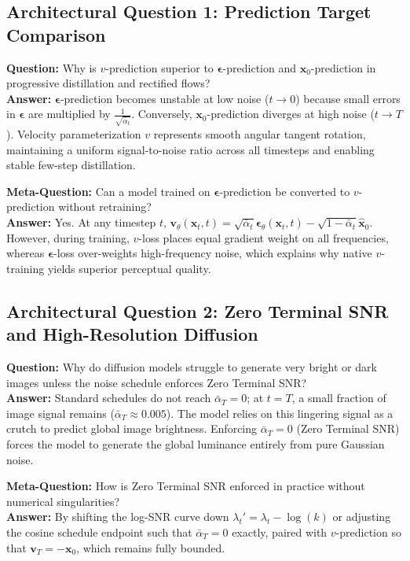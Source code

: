 \documentclass[11pt,a4paper]{article}
\theoremstyle{definition}
\begin{document}
\subsection{Architectural Question 1: Prediction Target Comparison}
\textbf{Question:} Why is $v$-prediction superior to $\boldsymbol{\epsilon}$-prediction and $\mathbf{x}_0$-prediction in progressive distillation and rectified flows?\\
\textbf{Answer:} $\boldsymbol{\epsilon}$-prediction becomes unstable at low noise ($t \to 0$) because small errors in $\boldsymbol{\epsilon}$ are multiplied by $\frac{1}{\sqrt{\bar{\alpha}_t}}$. Conversely, $\mathbf{x}_0$-prediction diverges at high noise ($t \to T$). Velocity parameterization $v$ represents smooth angular tangent rotation, maintaining a uniform signal-to-noise ratio across all timesteps and enabling stable few-step distillation.

\textbf{Meta-Question:} Can a model trained on $\boldsymbol{\epsilon}$-prediction be converted to $v$-prediction without retraining?\\
\textbf{Answer:} Yes. At any timestep $t$, $\mathbf{v}_\theta(\mathbf{x}_t, t) = \sqrt{\bar{\alpha}_t}\boldsymbol{\epsilon}_\theta(\mathbf{x}_t, t) - \sqrt{1 - \bar{\alpha}_t}\hat{\mathbf{x}}_0$. However, during training, $v$-loss places equal gradient weight on all frequencies, whereas $\boldsymbol{\epsilon}$-loss over-weights high-frequency noise, which explains why native $v$-training yields superior perceptual quality.

\subsection{Architectural Question 2: Zero Terminal SNR and High-Resolution Diffusion}
\textbf{Question:} Why do diffusion models struggle to generate very bright or dark images unless the noise schedule enforces Zero Terminal SNR?\\
\textbf{Answer:} Standard schedules do not reach $\bar{\alpha}_T = 0$; at $t = T$, a small fraction of image signal remains ($\bar{\alpha}_T \approx 0.005$). The model relies on this lingering signal as a crutch to predict global image brightness. Enforcing $\bar{\alpha}_T = 0$ (Zero Terminal SNR) forces the model to generate the global luminance entirely from pure Gaussian noise.

\textbf{Meta-Question:} How is Zero Terminal SNR enforced in practice without numerical singularities?\\
\textbf{Answer:} By shifting the log-SNR curve down $\lambda_t' = \lambda_t - \log(k)$ or adjusting the cosine schedule endpoint such that $\bar{\alpha}_T = 0$ exactly, paired with $v$-prediction so that $\mathbf{v}_T = -\mathbf{x}_0$, which remains fully bounded.
\end{document}
